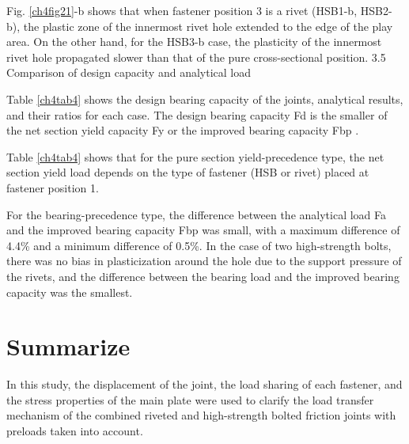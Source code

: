 Fig. \ref{ch4fig21}-b shows that when fastener position 3 is a rivet (HSB1-b, HSB2-b), the plastic zone of the innermost rivet hole extended to the edge of the play area. On the other hand, for the HSB3-b case, the plasticity of the innermost rivet hole propagated slower than that of the pure cross-sectional position.
 3.5 Comparison of design capacity and analytical load

Table \ref{ch4tab4} shows the design bearing capacity of the joints, analytical results, and their ratios for each case. The design bearing capacity Fd is the smaller of the net section yield capacity Fy or the improved bearing capacity Fbp .

Table \ref{ch4tab4} shows that for the pure section yield-precedence type, the net section yield load depends on the type of fastener (HSB or rivet) placed at fastener position 1.

For the bearing-precedence type, the difference between the analytical load Fa and the improved bearing capacity Fbp was small, with a maximum difference of 4.4\% and a minimum difference of 0.5\%. In the case of two high-strength bolts, there was no bias in plasticization around the hole due to the support pressure of the rivets, and the difference between the bearing load and the improved bearing capacity was the smallest.

\section{Summarize}

In this study, the displacement of the joint, the load sharing of each fastener, and the stress properties of the main plate were used to clarify the load transfer mechanism of the combined riveted and high-strength bolted friction joints with preloads taken into account.

